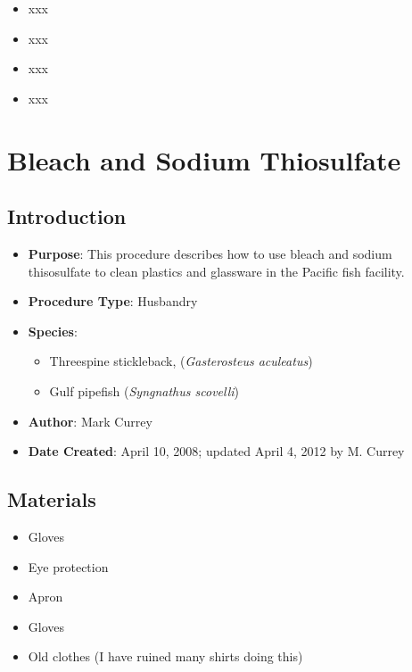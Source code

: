 \documentclass[
  letterpaper,
  DIV=11,
  numbers=noendperiod]{scrreprt}
\providecommand{\tightlist}{%
  \setlength{\itemsep}{0pt}\setlength{\parskip}{0pt}}\usepackage{longtable,booktabs,array}
\begin{document}
\begin{itemize}
\tightlist
\item
  xxx
\item
  xxx
\item
  xxx
\item
  xxx
\end{itemize}

\hypertarget{sec-husbandry-Plastic_Glassware_cleaning-bleach}{%
\chapter{Bleach and Sodium
Thiosulfate}\label{sec-husbandry-Plastic_Glassware_cleaning-bleach}}

\hypertarget{introduction-10}{%
\section{Introduction}\label{introduction-10}}

\begin{itemize}
\tightlist
\item
  \textbf{Purpose}: This procedure describes how to use bleach and
  sodium thisosulfate to clean plastics and glassware in the Pacific
  fish facility.
\item
  \textbf{Procedure Type}: Husbandry
\item
  \textbf{Species}:

  \begin{itemize}
  \tightlist
  \item
    Threespine stickleback, (\emph{Gasterosteus aculeatus})
  \item
    Gulf pipefish (\emph{Syngnathus scovelli})
  \end{itemize}
\item
  \textbf{Author}: Mark Currey
\item
  \textbf{Date Created}: April 10, 2008; updated April 4, 2012 by M.
  Currey
\end{itemize}

\hypertarget{materials-10}{%
\section{Materials}\label{materials-10}}

\begin{itemize}
\tightlist
\item
  Gloves
\item
  Eye protection
\item
  Apron
\item
  Gloves
\item
  Old clothes (I have ruined many shirts doing this)
\end{itemize}
\end{document}

